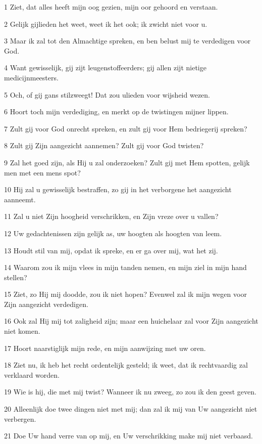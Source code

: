 \par 1 Ziet, dat alles heeft mijn oog gezien, mijn oor gehoord en verstaan.
\par 2 Gelijk gijlieden het weet, weet ik het ook; ik zwicht niet voor u.
\par 3 Maar ik zal tot den Almachtige spreken, en ben belust mij te verdedigen voor God.
\par 4 Want gewisselijk, gij zijt leugenstoffeerders; gij allen zijt nietige medicijnmeesters.
\par 5 Och, of gij gans stilzweegt! Dat zou ulieden voor wijsheid wezen.
\par 6 Hoort toch mijn verdediging, en merkt op de twistingen mijner lippen.
\par 7 Zult gij voor God onrecht spreken, en zult gij voor Hem bedriegerij spreken?
\par 8 Zult gij Zijn aangezicht aannemen? Zult gij voor God twisten?
\par 9 Zal het goed zijn, als Hij u zal onderzoeken? Zult gij met Hem spotten, gelijk men met een mens spot?
\par 10 Hij zal u gewisselijk bestraffen, zo gij in het verborgene het aangezicht aanneemt.
\par 11 Zal u niet Zijn hoogheid verschrikken, en Zijn vreze over u vallen?
\par 12 Uw gedachtenissen zijn gelijk as, uw hoogten als hoogten van leem.
\par 13 Houdt stil van mij, opdat ik spreke, en er ga over mij, wat het zij.
\par 14 Waarom zou ik mijn vlees in mijn tanden nemen, en mijn ziel in mijn hand stellen?
\par 15 Ziet, zo Hij mij doodde, zou ik niet hopen? Evenwel zal ik mijn wegen voor Zijn aangezicht verdedigen.
\par 16 Ook zal Hij mij tot zaligheid zijn; maar een huichelaar zal voor Zijn aangezicht niet komen.
\par 17 Hoort naarstiglijk mijn rede, en mijn aanwijzing met uw oren.
\par 18 Ziet nu, ik heb het recht ordentelijk gesteld; ik weet, dat ik rechtvaardig zal verklaard worden.
\par 19 Wie is hij, die met mij twist? Wanneer ik nu zweeg, zo zou ik den geest geven.
\par 20 Alleenlijk doe twee dingen niet met mij; dan zal ik mij van Uw aangezicht niet verbergen.
\par 21 Doe Uw hand verre van op mij, en Uw verschrikking make mij niet verbaasd.
